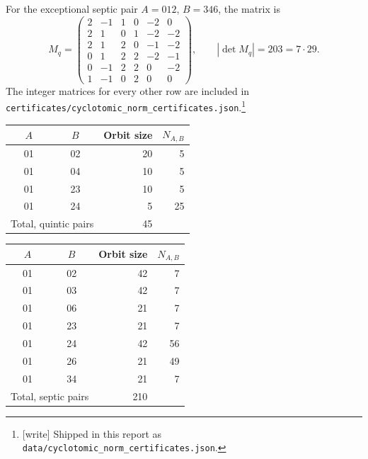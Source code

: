 \documentclass[11pt,a4paper]{article}
\theoremstyle{definition}
\theoremstyle{remark}
\newcommand{\code}[1]{{\small\nolinkurl{#1}}}
\begin{document}
For the exceptional septic pair $A=012$, $B=346$, the matrix is
\begin{equation}
 M_q=\begin{pmatrix}
 2&-1&1&0&-2&0\\
 2&1&0&1&-2&-2\\
 2&1&2&0&-1&-2\\
 0&1&2&2&-2&-1\\
 0&-1&2&2&0&-2\\
 1&-1&0&2&0&0
 \end{pmatrix},\qquad |\det M_q|=203=7\cdot29.
 \label{rss:eq:matrix203}
\end{equation}
The integer matrices for every other row are included in
\code{certificates/cyclotomic_norm_certificates.json}.\footnote{[write] Shipped
in this report as \code{data/cyclotomic_norm_certificates.json}.}

\begin{center}
\begin{tabular}{@{}ccrr@{}}
\toprule
$A$ & $B$ & Orbit size & $N_{A,B}$\\
\midrule
01&02&20&5\\
01&04&10&5\\
01&23&10&5\\
01&24&5&25\\
\midrule
\multicolumn{2}{l}{Total, quintic pairs}&45&\\
\bottomrule
\end{tabular}
\qquad
\begin{tabular}{@{}ccrr@{}}
\toprule
$A$ & $B$ & Orbit size & $N_{A,B}$\\
\midrule
01&02&42&7\\
01&03&42&7\\
01&06&21&7\\
01&23&21&7\\
01&24&42&56\\
01&26&21&49\\
01&34&21&7\\
\midrule
\multicolumn{2}{l}{Total, septic pairs}&210&\\
\bottomrule
\end{tabular}
\end{center}
\end{document}
